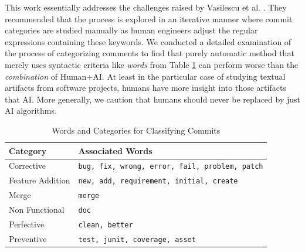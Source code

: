 \documentclass[sigconf,review, anonymous]{acmart}
\newcommand{\bi}{\begin{itemize}[leftmargin=0.4cm]}
\newcommand{\ei}{\end{itemize}}
\begin{document}



This work essentially addresses the challenges raised by Vasilescu et al. \cite{Vasilescu15github}. They recommended that the process is explored in an iterative manner where commit categories are studied manually as human engineers adjust the regular expressions containing these keywords.  We conducted a detailed examination of the process of categorizing comments to find that purely automatic method that merely uses syntactic criteria like  {\em words} from Table \ref{tab:words} can perform worse than the {\em combination} of Human+AI. At least in the particular case of studying textual artifacts from software projects, humans have more insight into those artifacts that AI.  More generally, we caution that humans should never be replaced by just AI algorithms. 

\begin{table}
\small
\caption{Words and Categories for Classifying Commits \cite{hindle08_largecommits}}\label{tab:words}
\vspace{-10pt}
 {\footnotesize \begin{tabular}{l|l}
\textbf{Category}  & \textbf{Associated Words}    \\\hline
Corrective & \texttt{bug, fix, wrong, error, fail, problem, patch} \\
Feature Addition & \texttt{new, add, requirement, initial, create} \\
Merge & \texttt{merge} \\
Non Functional & \texttt{doc} \\
Perfective & \texttt{clean, better} \\  
Preventive & \texttt{test, junit, coverage, asset} \\
\end{tabular}}
\vspace{-8mm}
\end{table}
\end{document}
